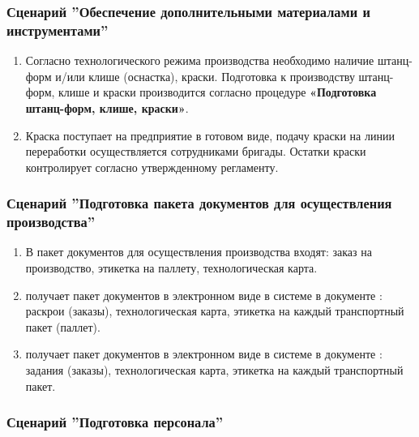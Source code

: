 \subsubsection{Сценарий ''Обеспечение дополнительными материалами и инструментами''}
\label{bp:production_5}

\begin{enumerate}
\item	Согласно технологического режима производства необходимо наличие штанц-форм и/или клише (оснастка), краски. Подготовка к производству штанц-форм, клише и краски производится согласно процедуре \textbf{«Подготовка штанц-форм, клише, краски»}.

\item Краска поступает на предприятие в готовом виде, подачу краски на линии переработки осуществляется сотрудниками бригады. Остатки краски \master контролирует согласно утвержденному регламенту.

\end{enumerate}



\subsubsection{Сценарий ''Подготовка пакета документов для осуществления производства''}
\label{bp:production_6}

\begin{enumerate}
\item	В пакет документов для осуществления производства входят: заказ на производство, этикетка на паллету, технологическая карта.
\item \gaoperator получает пакет документов в электронном виде в системе \gofro в документе : раскрои (заказы), технологическая карта, этикетка на каждый транспортный пакет (паллет).
\item \operator получает пакет документов в электронном виде в системе \gofro в документе : задания (заказы), технологическая карта, этикетка на каждый транспортный пакет.


\end{enumerate}


\subsubsection{Сценарий ''Подготовка персонала''}
\label{bp:production_7}

